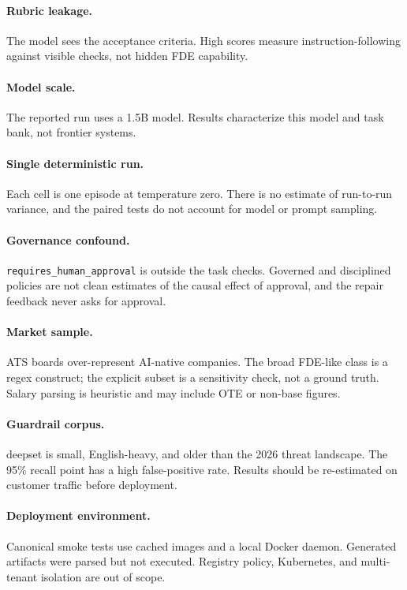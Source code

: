 \documentclass[11pt]{article}
\begin{document}
\paragraph{Rubric leakage.} The model sees the acceptance criteria. High scores measure instruction-following against visible checks, not hidden FDE capability.

\paragraph{Model scale.} The reported run uses a 1.5B model. Results characterize this model and task bank, not frontier systems.

\paragraph{Single deterministic run.} Each cell is one episode at temperature zero. There is no estimate of run-to-run variance, and the paired tests do not account for model or prompt sampling.

\paragraph{Governance confound.} \texttt{requires\_human\_approval} is outside the task checks. Governed and disciplined policies are not clean estimates of the causal effect of approval, and the repair feedback never asks for approval.

\paragraph{Market sample.} ATS boards over-represent AI-native companies. The broad FDE-like class is a regex construct; the explicit subset is a sensitivity check, not a ground truth. Salary parsing is heuristic and may include OTE or non-base figures.

\paragraph{Guardrail corpus.} deepset is small, English-heavy, and older than the 2026 threat landscape. The 95\% recall point has a high false-positive rate. Results should be re-estimated on customer traffic before deployment.

\paragraph{Deployment environment.} Canonical smoke tests use cached images and a local Docker daemon. Generated artifacts were parsed but not executed. Registry policy, Kubernetes, and multi-tenant isolation are out of scope.
\end{document}

